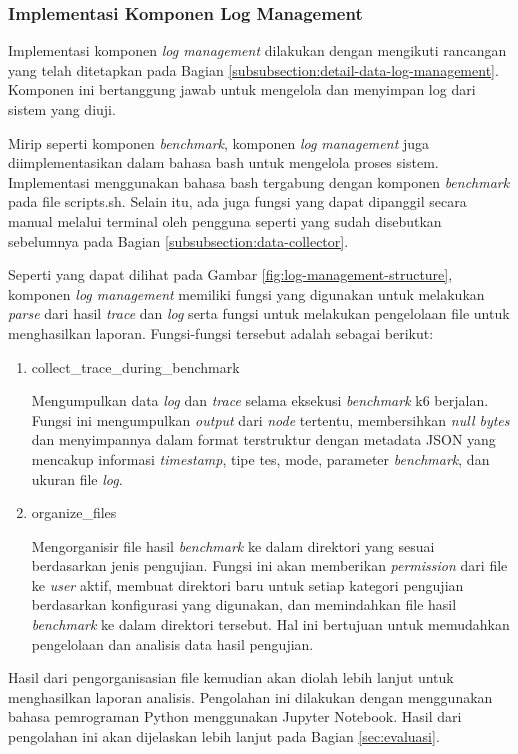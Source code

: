 \subsubsection{Implementasi Komponen Log Management}
\label{subsubsection:implementasi-log-management}

Implementasi komponen \textit{log management} dilakukan dengan mengikuti rancangan yang telah ditetapkan pada Bagian \ref{subsubsection:detail-data-log-management}. Komponen ini bertanggung jawab untuk mengelola dan menyimpan log dari sistem yang diuji.

Mirip seperti komponen \textit{benchmark}, komponen \textit{log management} juga diimplementasikan dalam bahasa bash untuk mengelola proses sistem. Implementasi menggunakan bahasa bash tergabung dengan komponen \textit{benchmark} pada file scripts.sh. Selain itu, ada juga fungsi yang dapat dipanggil secara manual melalui terminal oleh pengguna seperti yang sudah disebutkan sebelumnya pada Bagian \ref{subsubsection:data-collector}.

Seperti yang dapat dilihat pada Gambar \ref{fig:log-management-structure}, komponen \textit{log management} memiliki fungsi yang digunakan untuk melakukan \textit{parse} dari hasil \textit{trace} dan \textit{log} serta fungsi untuk melakukan pengelolaan file untuk menghasilkan laporan. Fungsi-fungsi tersebut adalah sebagai berikut:

\begin{enumerate}
	\item collect\_trace\_during\_benchmark

	      Mengumpulkan data \textit{log} dan \textit{trace} selama eksekusi \textit{benchmark} k6 berjalan. Fungsi ini mengumpulkan \textit{output} dari \textit{node} tertentu, membersihkan \textit{null bytes} dan menyimpannya dalam format terstruktur dengan metadata JSON yang mencakup informasi \textit{timestamp}, tipe tes, mode, parameter \textit{benchmark}, dan ukuran file \textit{log}.

	\item organize\_files

	      Mengorganisir file hasil \textit{benchmark} ke dalam direktori yang sesuai berdasarkan jenis pengujian. Fungsi ini akan memberikan \textit{permission} dari file ke \textit{user} aktif, membuat direktori baru untuk setiap kategori pengujian berdasarkan konfigurasi yang digunakan, dan memindahkan file hasil \textit{benchmark} ke dalam direktori tersebut. Hal ini bertujuan untuk memudahkan pengelolaan dan analisis data hasil pengujian.

\end{enumerate}

Hasil dari pengorganisasian file kemudian akan diolah lebih lanjut untuk menghasilkan laporan analisis. Pengolahan ini dilakukan dengan menggunakan bahasa pemrograman Python menggunakan Jupyter Notebook. Hasil dari pengolahan ini akan dijelaskan lebih lanjut pada Bagian \ref{sec:evaluasi}.
